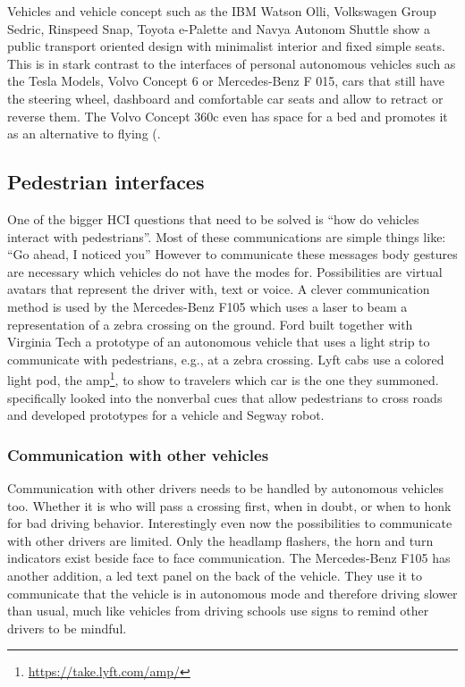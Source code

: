 Vehicles and vehicle concept such as the IBM Watson Olli, Volkswagen Group Sedric, Rinspeed Snap, Toyota e-Palette and Navya Autonom Shuttle show a public transport oriented design with minimalist interior and fixed simple seats. This is in stark contrast to the interfaces of personal autonomous vehicles such as the Tesla Models, Volvo Concept 6 or Mercedes-Benz F 015, cars that still have the steering wheel, dashboard and comfortable car seats and allow to retract or reverse them. The Volvo Concept 360c even has space for a bed and promotes it as an alternative to flying (.   

\subsection{Pedestrian interfaces}\label{ssec:pedestrian}  
One of the bigger HCI questions that need to be solved is “how do vehicles interact with pedestrians”. Most of these communications are simple things like: “Go ahead, I noticed you” However to communicate these messages body gestures are necessary which vehicles do not have the modes for. Possibilities are virtual avatars that represent the driver with, text or voice.  A clever communication method is used by the Mercedes-Benz F105 which uses a laser to beam a representation of a zebra crossing on the ground. Ford built together with Virginia Tech a prototype of an autonomous vehicle that uses a light strip to communicate with pedestrians, e.g., at a zebra crossing\cite{FordMotorCompany2017FordPeople}. Lyft cabs use a colored light pod, the amp\footnote{\url{https://take.lyft.com/amp/}}, to show to travelers which car is the one they summoned. \cite{Mahadevan2018} specifically looked into the nonverbal cues that allow pedestrians to cross roads and developed prototypes for a vehicle and Segway robot. 

\subsubsection{Communication with other vehicles} 
Communication with other drivers needs to be handled by autonomous vehicles too. Whether it is who will pass a crossing first, when in doubt, or when to honk for bad driving behavior. Interestingly even now the possibilities to communicate with other drivers are limited. Only the headlamp flashers, the horn and turn indicators exist beside face to face communication. The Mercedes-Benz F105 has another addition, a led text panel on the back of the vehicle. They use it to communicate that the vehicle is in autonomous mode and therefore driving slower than usual, much like vehicles from driving schools use signs to remind other drivers to be mindful.  


